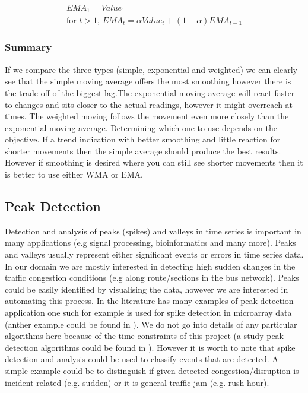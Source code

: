\begin{align}\label{ema}
EMA_1 = Value_1 \\
\textrm{for } t > 1\textrm{, }EMA_t = \alpha Value_t + (1-\alpha) EMA_{t-1}
\end{align}

\subsubsection{Summary}
If we compare the three types (simple, exponential and weighted) we can clearly see that the simple moving average offers the most smoothing however there is the trade-off of the biggest lag.The exponential moving average will react faster to changes and sits closer to the actual readings, however it might overreach at times. The weighted moving follows the movement even more closely than the exponential moving average. Determining which one to use depends on the objective. If a trend indication with better smoothing and little reaction for shorter movements then the simple average should produce the best results. However if smoothing is desired where you can still see shorter movements then it is better to use either WMA or EMA.

\subsection{Peak Detection}
Detection and analysis of peaks (spikes) and valleys in time series is important in many applications (e.g signal processing, bioinformatics and many more). Peaks and valleys usually represent either significant events or errors in time series data. In our domain we are mostly interested in detecting high sudden changes in the traffic congestion conditions (e.g along route/sections in the bus network). Peaks could be easily identified by visualising the data, however we are interested in automating this process. In the literature has many examples of peak detection application one such for example is \cite{simplePeakDetection} used for spike detection in microarray data (anther example could be found in \cite{Azami2014491}). We do not go into details of any particular algorithms here because of the time constraints of this project (a study peak detection algorithms could be found in \cite{ventzas2011peak}). However it is worth to note that spike detection and analysis could be used to classify events that are detected. A simple example could be to distinguish if given detected congestion/disruption is incident related (e.g. sudden) or it is general traffic jam (e.g. rush hour).

